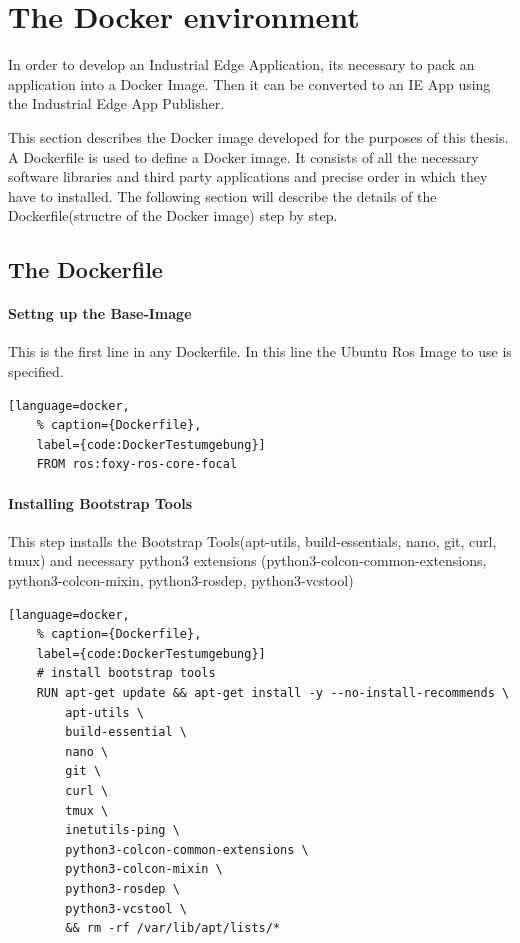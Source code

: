\section{The Docker environment}
\label{Implementierung:DockerEnvironment}
In order to develop an Industrial Edge Application, its necessary to pack an application into a Docker Image. Then it can be converted to an IE App using the Industrial Edge App Publisher.

This section describes the Docker image developed for the purposes of this thesis. A Dockerfile is used to define a Docker image. It consists of all the necessary software libraries and third party applications and precise order in which they have to installed. The following section will describe the details of the Dockerfile(structre of the Docker image) step by step.
\subsection{The Dockerfile}
\paragraph{Settng up the Base-Image} This is the first line in any Dockerfile. In this line the Ubuntu Ros Image to use is specified.
\begin{lstlisting}[language=docker,
	% caption={Dockerfile}, 
	label={code:DockerTestumgebung}]
	FROM ros:foxy-ros-core-focal
\end{lstlisting}


\paragraph{Installing Bootstrap Tools} This step installs the Bootstrap Tools(apt-utils, build-essentials, nano, git, curl, tmux) and necessary python3 extensions (python3-colcon-common-extensions, python3-colcon-mixin, python3-rosdep, python3-vcstool)

\begin{lstlisting}[language=docker,
	% caption={Dockerfile}, 
	label={code:DockerTestumgebung}]
	# install bootstrap tools
	RUN apt-get update && apt-get install -y --no-install-recommends \
		apt-utils \
		build-essential \
		nano \
		git \
		curl \
		tmux \
		inetutils-ping \
		python3-colcon-common-extensions \
		python3-colcon-mixin \
		python3-rosdep \
		python3-vcstool \
		&& rm -rf /var/lib/apt/lists/*

\end{lstlisting}

